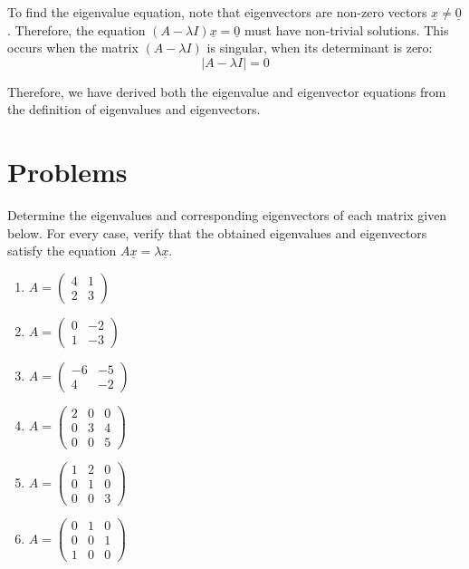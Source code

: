 To find the eigenvalue equation, note that eigenvectors are non-zero vectors $\underline{x} \neq \underline{0}$. Therefore, the equation $(A - \lambda I) \underline{x} = \underline{0}$ must have non-trivial solutions. This occurs when the matrix $(A - \lambda I)$ is singular, when its determinant is zero:
$$|A - \lambda I| = 0$$

Therefore, we have derived both the eigenvalue and eigenvector equations from the definition of eigenvalues and eigenvectors.

\newpage

\section{Problems}

\begin{question}
Determine the eigenvalues and corresponding eigenvectors of each matrix given below. For every case, verify that the obtained eigenvalues and eigenvectors satisfy the equation $A \underline{x} = \lambda \underline{x}$.
\end{question}

\begin{enumerate}[label=\alph*)]
    \item $A = \begin{pmatrix} 4 & 1 \\ 2 & 3 \end{pmatrix}$ 
    \item $A = \begin{pmatrix} 0 & -2 \\ 1 & -3 \end{pmatrix}$ 
    \item $A = \begin{pmatrix} -6 & -5 \\ 4 & -2 \end{pmatrix}$ 
    \item $A = \begin{pmatrix} 2 & 0 & 0 \\ 0 & 3 & 4 \\ 0 & 0 & 5 \end{pmatrix}$ 
    \item $A = \begin{pmatrix} 1 & 2 & 0 \\ 0 & 1 & 0 \\ 0 & 0 & 3 \end{pmatrix}$ 
    \item $A = \begin{pmatrix} 0 & 1 & 0 \\ 0 & 0 & 1 \\ 1 & 0 & 0 \end{pmatrix}$ 
\end{enumerate}

